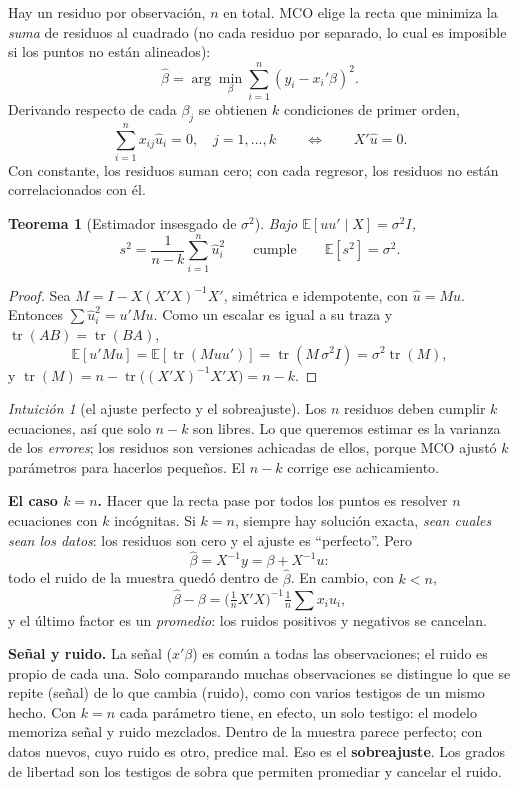 \documentclass[11pt,a4paper]{article}
\theoremstyle{plain}
\newtheorem{teorema}{Teorema}[section]
\theoremstyle{definition}
\theoremstyle{remark}
\newtheorem*{intuicion}{Intuición}
\newcommand{\E}{\mathbb{E}}
\DeclareMathOperator{\tr}{tr}
\begin{document}
Hay un residuo por observación, $n$ en total. MCO elige la recta que minimiza la
\emph{suma} de residuos al cuadrado (no cada residuo por separado, lo cual es imposible si
los puntos no están alineados):
\[
\hat\beta=\arg\min_\beta\sum_{i=1}^n(y_i-x_i'\beta)^2 .
\]
Derivando respecto de cada $\beta_j$ se obtienen $k$ condiciones de primer orden,
\[
\sum_{i=1}^n x_{ij}\hat u_i=0,\quad j=1,\dots,k\qquad\Longleftrightarrow\qquad X'\hat u=0 .
\]
Con constante, los residuos suman cero; con cada regresor, los residuos no están
correlacionados con él.

\begin{teorema}[Estimador insesgado de $\sigma^2$]\label{teo:s2reg}
Bajo $\E[uu'\mid X]=\sigma^2I$,
\[
s^2=\frac{1}{n-k}\sum_{i=1}^n\hat u_i^2\qquad\text{cumple}\qquad\E[s^2]=\sigma^2 .
\]
\end{teorema}
\begin{proof}
Sea $M=I-X(X'X)^{-1}X'$, simétrica e idempotente, con $\hat u=Mu$. Entonces
$\sum\hat u_i^2=u'Mu$. Como un escalar es igual a su traza y $\tr(AB)=\tr(BA)$,
\[
\E[u'Mu]=\E[\tr(Muu')]=\tr(M\,\sigma^2I)=\sigma^2\tr(M),
\]
y $\tr(M)=n-\tr\big((X'X)^{-1}X'X\big)=n-k$.
\end{proof}

\begin{intuicion}[el ajuste perfecto y el sobreajuste]
Los $n$ residuos deben cumplir $k$ ecuaciones, así que solo $n-k$ son libres. Lo que queremos
estimar es la varianza de los \emph{errores}; los residuos son versiones achicadas de ellos,
porque MCO ajustó $k$ parámetros para hacerlos pequeños. El $n-k$ corrige ese achicamiento.

\textbf{El caso $k=n$.} Hacer que la recta pase por todos los puntos es resolver $n$
ecuaciones con $k$ incógnitas. Si $k=n$, siempre hay solución exacta, \emph{sean cuales sean
los datos}: los residuos son cero y el ajuste es ``perfecto''. Pero
\[
\hat\beta=X^{-1}y=\beta+X^{-1}u :
\]
todo el ruido de la muestra quedó dentro de $\hat\beta$. En cambio, con $k<n$,
\[
\hat\beta-\beta=\Big(\tfrac1nX'X\Big)^{-1}\tfrac1n\sum x_iu_i ,
\]
y el último factor es un \emph{promedio}: los ruidos positivos y negativos se cancelan.

\textbf{Señal y ruido.} La señal ($x'\beta$) es común a todas las observaciones; el ruido es
propio de cada una. Solo comparando muchas observaciones se distingue lo que se repite (señal)
de lo que cambia (ruido), como con varios testigos de un mismo hecho. Con $k=n$ cada
parámetro tiene, en efecto, un solo testigo: el modelo memoriza señal y ruido mezclados.
Dentro de la muestra parece perfecto; con datos nuevos, cuyo ruido es otro, predice mal. Eso
es el \textbf{sobreajuste}. Los grados de libertad son los testigos de sobra que permiten
promediar y cancelar el ruido.
\end{intuicion}
\end{document}

